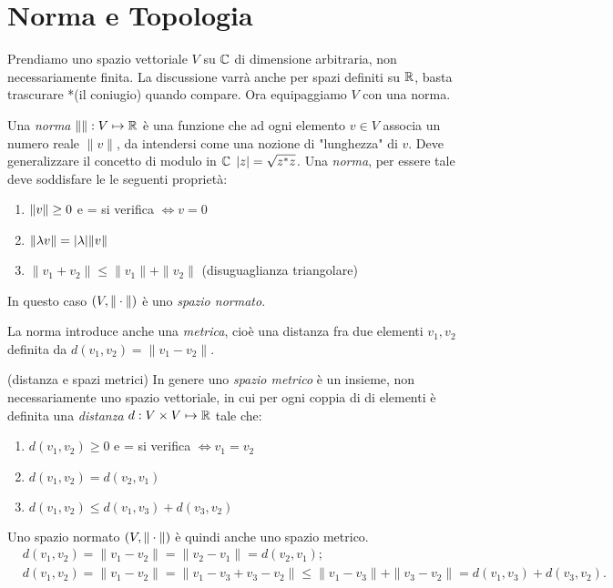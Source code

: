 \chapter{Norma e Topologia}
Prendiamo uno spazio vettoriale $V$ su $\mathbb C$ di dimensione arbitraria, non
necessariamente finita. La discussione varrà anche per spazi definiti su
$\mathbb R$, basta trascurare *(il coniugio) quando compare. Ora equipaggiamo $V$
con una norma.
\begin{definition}
Una \emph{norma} $\| \|: V \mapsto \mathbb R$ è una funzione che ad ogni elemento
$v \in V$ associa un numero reale $\|v\|$, da intendersi come una nozione di
"lunghezza" di $v$. Deve generalizzare il concetto di modulo in $\mathbb C$ 
${\left|z\right|} = \sqrt{z^* z}$. Una \emph{norma}, per essere tale deve soddisfare le
le seguenti proprietà:
\begin{enumerate}[1)]
	\item ${\|v\|} \geq 0$ e = si verifica $\iff v = 0$
	\item ${\|\lambda v\|} = {\left|\lambda\right|} {\|v\|}$
	\item $\|v_1 + v_2\| \leq \|v_1\| + \|v_2\|$ (disuguaglianza triangolare)
\end{enumerate}
In questo caso $\left(V, {\|\cdot\|} \right)$ è uno \emph{spazio normato}.
\end{definition}
La norma introduce anche una \emph{metrica}, cioè una distanza fra due elementi
$v_1, v_2$ definita da $d(v_1, v_2) = \|v_1 - v_2\|$. 
\begin{definition}{(distanza e spazi metrici)}
In genere uno \emph{spazio metrico} è un insieme, non necessariamente uno
spazio vettoriale, in cui per ogni coppia di di elementi è definita una
\emph{distanza} $d: V \times V \mapsto \mathbb R$ tale che:
\begin{enumerate}[1)]
	\item $d(v_1, v_2) \geq 0$ e = si verifica $\iff v_1 = v_2$
	\item $d(v_1, v_2) = d(v_2, v_1)$
	\item $d(v_1, v_2) \leq d(v_1, v_3) + d(v_3, v_2)$
\end{enumerate}
\end{definition}
Uno spazio normato $\left(V, {\|\cdot\|} \right)$ è quindi anche uno spazio metrico.
\begin{align*}
	&d(v_1, v_2) = \|v_1 - v_2\| = \|v_2 - v_1\| = d(v_2, v_1) ;\\ 
	&d(v_1, v_2) = \|v_1 - v_2\| = \|v_1 - v_3 +v_3 -v_2 \| \leq
	\|v_1 - v_3\| + \|v_3 - v_2\| = d(v_1, v_3) + d(v_3, v_2).
\end{align*}
